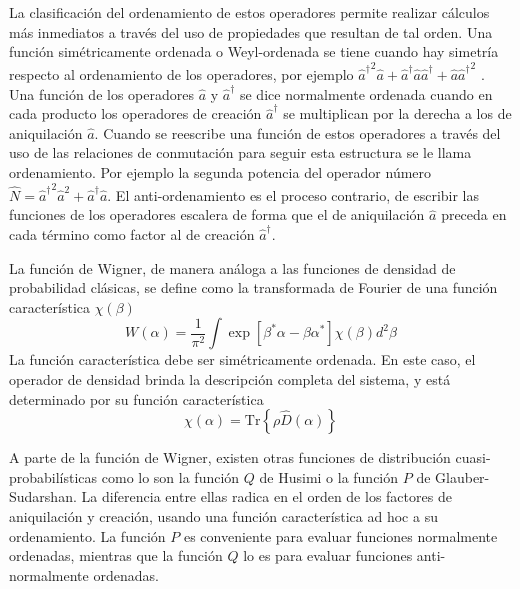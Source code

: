 La clasificación del ordenamiento de estos operadores permite realizar cálculos más inmediatos a través del uso de propiedades que resultan de tal orden. Una función simétricamente ordenada o Weyl-ordenada se tiene cuando hay simetría respecto al ordenamiento de los operadores, por ejemplo ${\hat{a}^\dagger}^2 \hat{a} + \hat{a}^\dagger \hat{a}\hat{a}^\dagger + \hat{a} {\hat{a}^\dagger}^2 $ \cite{Mandel}. Una función de los operadores $\hat{a}$ y $\hat{a}^\dagger$ se dice normalmente ordenada cuando en cada producto los operadores de creación $\hat{a}^\dagger$ se multiplican por la derecha a los de aniquilación $\hat{a}$. Cuando se reescribe una función de estos operadores a través del uso de las relaciones de conmutación para seguir esta estructura se le llama ordenamiento. Por ejemplo la segunda potencia del operador número $\hat{N}={\hat{a}^\dagger}^2 \hat{a}^2 + \hat{a}^\dagger \hat{a}$. El anti-ordenamiento es el proceso contrario, de escribir las funciones de los operadores escalera de forma que el de aniquilación $\hat{a}$ preceda en cada término como factor al de creación $\hat{a}^\dagger$.

La función de Wigner, de manera análoga a las funciones de densidad de probabilidad clásicas, se define como la transformada de Fourier de una función característica $\chi(\beta)$
\begin{equation*}
  W(\alpha) = \frac{1}{\pi^2}\int \exp{\left[ \beta^* \alpha - \beta \alpha^* \right]} \chi(\beta) d^2\beta
\end{equation*}
La función característica debe ser simétricamente ordenada. En este caso, el operador de densidad brinda la descripción completa del sistema, y está determinado por su función característica
\begin{equation*}
  \chi(\alpha) = \text{Tr}\left\{ \rho \hat{D}(\alpha)  \right\}
\end{equation*}

A parte de la función de Wigner, existen otras funciones de distribución cuasi-probabilísticas como lo son la función $Q$ de Husimi o la función $P$ de Glauber-Sudarshan. La diferencia entre ellas radica en el orden de los factores de aniquilación y creación, usando una función característica ad hoc a su  ordenamiento. La función $P$ es conveniente para evaluar funciones normalmente ordenadas, mientras que la función $Q$ lo es para evaluar funciones anti-normalmente ordenadas.

